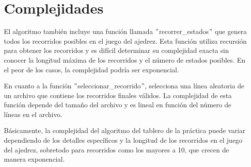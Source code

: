 \section{Complejidades}
El algoritmo también incluye una función llamada $"$recorrer\_estados$"$ que genera todos los recorridos posibles en el juego del ajedrez. Esta función utiliza recursión para obtener los recorridos y es difícil determinar su complejidad exacta sin conocer la longitud máxima de los recorridos y el número de estados posibles. En el peor de los casos, la complejidad podría ser exponencial.\newline

En cuanto a la función $"$seleccionar\_recorrido$"$, selecciona una línea aleatoria de un archivo que contiene los recorridos finales válidos. La complejidad de esta función depende del tamaño del archivo y es lineal en función del número de líneas en el archivo.\newline

Básicamente, la complejidad del algoritmo del tablero de la práctica puede variar dependiendo de los detalles específicos y la longitud de los recorridos en el juego del ajedrez, sobretodo para recorridos como los mayores a 10, que crecen de manera exponencial.\newline
